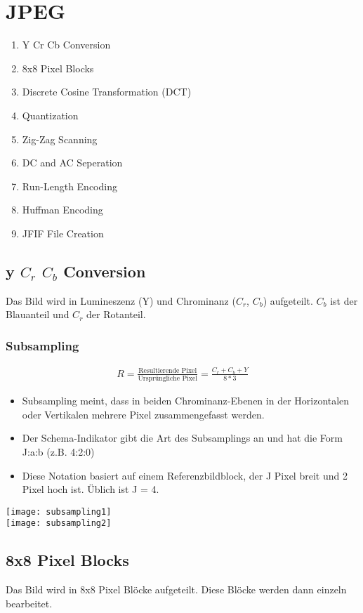 \section{JPEG}
\begin{enumerate}
	\item Y Cr Cb Conversion
	\item 8x8 Pixel Blocks
	\item Discrete Cosine Transformation (DCT)
	\item Quantization
	\item Zig-Zag Scanning
	\item DC and AC Seperation
	\item Run-Length Encoding
	\item Huffman Encoding
	\item JFIF File Creation
\end{enumerate}
\subsection{y $C_r$ $C_b$ Conversion}
Das Bild wird  in Lumineszenz (Y) und Chrominanz ($C_r$, $C_b$) aufgeteilt.
$C_b$ ist der Blauanteil und $C_r$ der Rotanteil.
\subsubsection{Subsampling}
\begin{align*}
	R = \frac{\text{Resultierende Pixel}}{\text{Ursprüngliche Pixel}} = \frac{C_r + C_b + Y}{8 * 3}
\end{align*}
\begin{itemize}
	\item Subsampling meint, dass in beiden Chrominanz-Ebenen in der
	      Horizontalen oder Vertikalen mehrere Pixel zusammengefasst werden.
	\item Der Schema-Indikator gibt die Art des Subsamplings an und hat die
	      Form J:a:b (z.B. 4:2:0)
	\item Diese Notation basiert auf einem Referenzbildblock, der J Pixel breit und
	      2 Pixel hoch ist. Üblich ist J = 4.
\end{itemize}
\texttt{[image: subsampling1]}\\
\texttt{[image: subsampling2]}

\subsection{8x8 Pixel Blocks}
Das Bild wird in 8x8 Pixel Blöcke aufgeteilt. Diese Blöcke werden dann einzeln bearbeitet.
